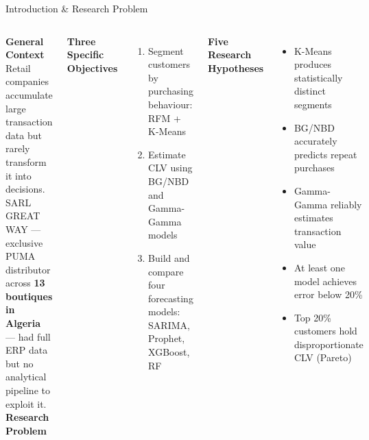 \documentclass[aspectratio=169,12pt]{beamer}
\begin{document}
\begin{frame}{Introduction \& Research Problem}
\begin{columns}[t]
  \textbf{\color{PumaRed}\small General Context}\\[2pt]
  {\scriptsize Retail companies accumulate large transaction data but rarely transform it into decisions. SARL GREAT WAY --- exclusive PUMA distributor across \textbf{13 boutiques in Algeria} --- had full ERP data but no analytical pipeline to exploit it.}\\[4pt]

  \textbf{\color{PumaRed}\small Research Problem}\\[2pt]

  \textbf{\color{PumaRed}\small Three Specific Objectives}
  \begin{enumerate}\scriptsize
    \item Segment customers by purchasing behaviour: RFM + K-Means
    \item Estimate CLV using BG/NBD and Gamma-Gamma models
    \item Build and compare four forecasting models: SARIMA, Prophet, XGBoost, RF
  \end{enumerate}
  \vspace{2pt}
  \textbf{\color{PumaRed}\small Five Research Hypotheses}
  \begin{itemize}\scriptsize
    \item[\color{PumaRed}\textbf{H1}] K-Means produces statistically distinct segments
    \item[\color{PumaRed}\textbf{H2}] BG/NBD accurately predicts repeat purchases
    \item[\color{PumaRed}\textbf{H3}] Gamma-Gamma reliably estimates transaction value
    \item[\color{PumaRed}\textbf{H4}] At least one model achieves error below 20\%
    \item[\color{PumaRed}\textbf{H5}] Top 20\% customers hold disproportionate CLV (Pareto)
  \end{itemize}
\end{columns}
\end{frame}
\end{document}

